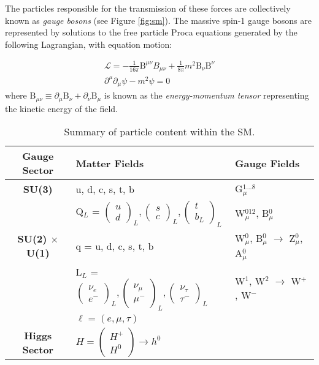 The particles responsible for the transmission of these forces are collectively known as \textit{gauge bosons} (see Figure \ref{fig:sm}). The massive spin-1 gauge bosons are represented by solutions to the free particle Proca equations generated by the following Lagrangian, with equation motion:

\begin{equation}
\begin{array}{l}
\mathcal{L} = -\frac{1}{16\pi} \mathrm{B}^{\mu\nu}B_{\mu\nu} + \frac{1}{8\pi}m^{2}\mathrm{B}_{\nu}\mathrm{B}^{\nu}\\
\partial^{\mu} \partial_{\mu} \psi - m^{2} \psi = 0
\end{array}
\end{equation}
where $\mathrm{B}_{\mu\nu} \equiv \partial_{\mu}\mathrm{B}_{\nu} + \partial_{\nu}\mathrm{B}_{\mu}$ is known as the \textit{energy-momentum tensor} representing the kinetic energy of the field.

\begin{table}
\caption{Summary of particle content within the SM.}
\centering
\begin{tabular}{c|ll}
\hline\hline
Gauge Sector & Matter Fields & Gauge Fields \\
\hline
\textbf{SU(3)} & u, d, c, s, t, b & G$_{\mu}^{1...8}$ \\
\hline
 & Q$_{L}$ = $\begin{pmatrix} u \\ d \end{pmatrix}_{L}, \begin{pmatrix} s \\ c \end{pmatrix}_{L}, \begin{pmatrix} t \\ b_{L} \end{pmatrix}_{L} $ & W$^{012}_{\mu}$, B$^{0}_{\mu}$ \\
\textbf{SU(2) $\times$ U(1)} & q = u, d, c, s, t, b & W$_{\mu}^{0}$, B$_{\mu}^{0}$ $\rightarrow$ Z$^{0}_{\mu}$, A$^{0}_{\mu}$\\
  & L$_{L}$ = $\begin{pmatrix} \nu_{e} \\ e^{-} \end{pmatrix}_{L} , \begin{pmatrix} \nu_{\mu} \\ \mu^{-} \end{pmatrix}_{L} , \begin{pmatrix} \nu_{\tau} \\ \tau^{-}\end{pmatrix}_{L} $ & W$^{1}$, W$^{2}$ $\rightarrow$ W$^{+}$, W$^{-}$\\
  & $\ell = (e, \mu, \tau)$ & \\
  \hline
\textbf{Higgs Sector} & $H = \begin{pmatrix} H^{+} \\ H^{0} \end{pmatrix} \rightarrow h^{0}$ & \\
  \hline\hline
\end{tabular}
\end{table}


